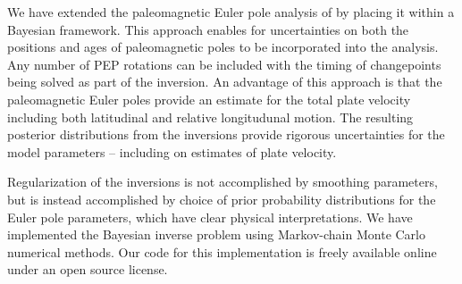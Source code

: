 \documentclass[11pt,letterpaper]{article}
\begin{document}

We have extended the paleomagnetic Euler pole analysis of \citet{Gordon1984a} by placing it within a Bayesian framework. This approach enables for uncertainties on both the positions and ages of paleomagnetic poles to be incorporated into the analysis. Any number of PEP rotations can be included with the timing of changepoints being solved as part of the inversion. An advantage of this approach is that the paleomagnetic Euler poles provide an estimate for the total plate velocity including both latitudinal and relative longitudunal motion. The resulting posterior distributions from the inversions provide rigorous uncertainties for the model parameters -- including on estimates of plate velocity. 

Regularization of the inversions is not accomplished by smoothing parameters, but is instead accomplished by choice of prior probability distributions for the Euler pole parameters, which have clear physical interpretations. We have implemented the Bayesian inverse problem using Markov-chain Monte Carlo numerical methods. Our code for this implementation is freely available online under an open source license.
\end{document}
